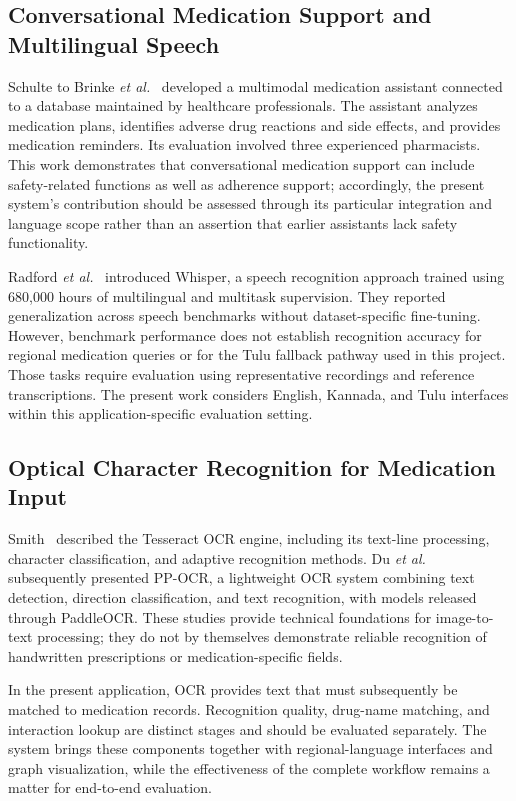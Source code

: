 \documentclass[9pt,journal,twoside,web]{ieeecolor}
\begin{document}
\subsection{Conversational Medication Support and Multilingual Speech}
Schulte to Brinke \emph{et al.}~\cite{schulte2021} developed a multimodal medication assistant connected to a database maintained by healthcare professionals. The assistant analyzes medication plans, identifies adverse drug reactions and side effects, and provides medication reminders. Its evaluation involved three experienced pharmacists. This work demonstrates that conversational medication support can include safety-related functions as well as adherence support; accordingly, the present system's contribution should be assessed through its particular integration and language scope rather than an assertion that earlier assistants lack safety functionality.

Radford \emph{et al.}~\cite{radford2023} introduced Whisper, a speech recognition approach trained using 680,000 hours of multilingual and multitask supervision. They reported generalization across speech benchmarks without dataset-specific fine-tuning. However, benchmark performance does not establish recognition accuracy for regional medication queries or for the Tulu fallback pathway used in this project. Those tasks require evaluation using representative recordings and reference transcriptions. The present work considers English, Kannada, and Tulu interfaces within this application-specific evaluation setting.

\subsection{Optical Character Recognition for Medication Input}
Smith~\cite{smith2007} described the Tesseract OCR engine, including its text-line processing, character classification, and adaptive recognition methods. Du \emph{et al.}~\cite{du2020} subsequently presented PP-OCR, a lightweight OCR system combining text detection, direction classification, and text recognition, with models released through PaddleOCR. These studies provide technical foundations for image-to-text processing; they do not by themselves demonstrate reliable recognition of handwritten prescriptions or medication-specific fields.

In the present application, OCR provides text that must subsequently be matched to medication records. Recognition quality, drug-name matching, and interaction lookup are distinct stages and should be evaluated separately. The system brings these components together with regional-language interfaces and graph visualization, while the effectiveness of the complete workflow remains a matter for end-to-end evaluation.
\end{document}
